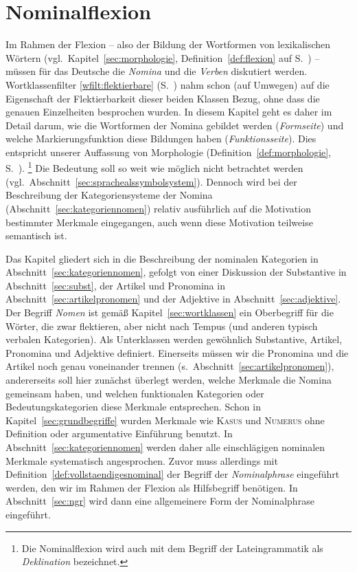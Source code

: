 \chapter{Nominalflexion}

\label{sec:nominalflexion}

Im Rahmen der Flexion -- also der Bildung der Wortformen von lexikalischen Wörtern (vgl.\ Kapitel~\ref{sec:morphologie}, Definition~\ref{def:flexion} auf S.~\pageref{def:flexion}) -- müssen für das Deutsche die \textit{Nomina} und die \textit{Verben} diskutiert werden.
Wortklassenfilter \ref{wfilt:flektierbare} (S.~\pageref{wfilt:flektierbare}) nahm schon (auf Umwegen) auf die Eigenschaft der Flektierbarkeit dieser beiden Klassen Bezug, ohne dass die genauen Einzelheiten besprochen wurden.
In diesem Kapitel geht es daher im Detail darum, wie die Wortformen der Nomina gebildet werden (\textit{Formseite}) und welche Markierungsfunktion diese Bildungen haben (\textit{Funktionsseite}).
Dies entspricht unserer Auffassung von Morphologie (Definition~\ref{def:morphologie}, S.~\pageref{def:morphologie}).%
\footnote{Die Nominalflexion wird auch mit dem Begriff der Lateingrammatik als \textit{Deklination} bezeichnet.}
Die Bedeutung soll so weit wie möglich nicht betrachtet werden (vgl.\ Abschnitt~\ref{sec:sprachealssymbolsystem}).
Dennoch wird bei der Beschreibung der Kategoriensysteme der Nomina (Abschnitt~\ref{sec:kategoriennomen}) relativ ausführlich auf die Motivation bestimmter Merkmale eingegangen, auch wenn diese Motivation teilweise semantisch ist.

Das Kapitel gliedert sich in die Beschreibung der nominalen Kategorien in Abschnitt~\ref{sec:kategoriennomen}, gefolgt von einer Diskussion der Substantive in Abschnitt~\ref{sec:subst}, der Artikel und Pronomina in Abschnitt~\ref{sec:artikelpronomen} und der Adjektive in Abschnitt~\ref{sec:adjektive}.
Der Begriff \textit{Nomen} ist gemäß Kapitel~\ref{sec:wortklassen} ein Oberbegriff für die Wörter, die zwar flektieren, aber nicht nach Tempus (und anderen typisch verbalen Kategorien).
Als Unterklassen werden gewöhnlich Substantive, Artikel, Pronomina und Adjektive definiert.
Einerseits müssen wir die Pronomina und die Artikel noch genau voneinander trennen (s.\ Abschnitt~\ref{sec:artikelpronomen}), andererseits soll hier zunächst überlegt werden, welche Merkmale die Nomina gemeinsam haben, und welchen funktionalen Kategorien oder Bedeutungskategorien diese Merkmale entsprechen.
Schon in Kapitel~\ref{sec:grundbegriffe} wurden Merkmale wie \textsc{Kasus} und \textsc{Numerus} ohne Definition oder argumentative Einführung benutzt.
In Abschnitt~\ref{sec:kategoriennomen} werden daher alle einschlägigen nominalen Merkmale systematisch angesprochen.
Zuvor muss allerdings mit Definition~\ref{def:vollstaendigesnominal} der Begriff der \textit{Nominalphrase} eingeführt werden, den wir im Rahmen der Flexion als Hilfsbegriff benötigen.
In Abschnitt~\ref{sec:ngr} wird dann eine allgemeinere Form der Nominalphrase eingeführt.


